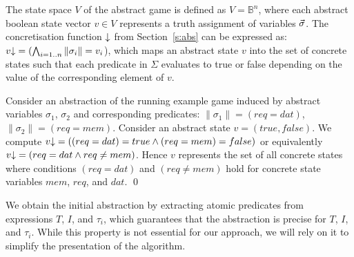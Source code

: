 The state space $V$ of the abstract game is defined as $V = \mathbb{B}^n$, where each abstract boolean state vector $v\in V$ represents a truth assignment of variables $\vec{\sigma}$. The concretisation function $\mathord{\downarrow}$ from Section~\ref{s:abs} can be expressed as: $v\mathord{\downarrow}=(\bigwedge_{i=1..n}\|\sigma_i\|=v_i$), which maps an abstract state $v$ into the set of concrete states such that each predicate in $\Sigma$ evaluates to true or false depending on the value of the corresponding element of $v$.

\begin{ex}
    \everymath{\mathtt{\xdef\tmp{\fam\the\fam\relax}\aftergroup\tmp}}
    \everydisplay{\mathtt{\xdef\tmp{\fam\the\fam\relax}\aftergroup\tmp}}
    Consider an abstraction of the running example game induced by abstract variables $\sigma_1$, $\sigma_2$ and corresponding predicates: $\|\sigma_1\| = (req=dat)$, $\|\sigma_2\| = (req = mem)$.  Consider an abstract state $v=(true,false)$. We compute $v\mathord{\downarrow} = ((req=dat) = true \land (req = mem)=false)$ or equivalently $v\mathord{\downarrow} = (req=dat \land req \neq mem)$.  Hence $v$ represents the set of all concrete states where conditions $(req=dat)$ and  $(req \neq mem)$ hold for concrete state variables $mem$, $req$, and $dat$.
    \qed
\end{ex}

We obtain the initial abstraction by extracting atomic predicates from expressions $T$, $I$, and $\tau_i$, which guarantees that the abstraction is precise for $T$, $I$, and $\tau_i$. While this property is not essential for our approach, we will rely on it to simplify the presentation of the algorithm.

%

